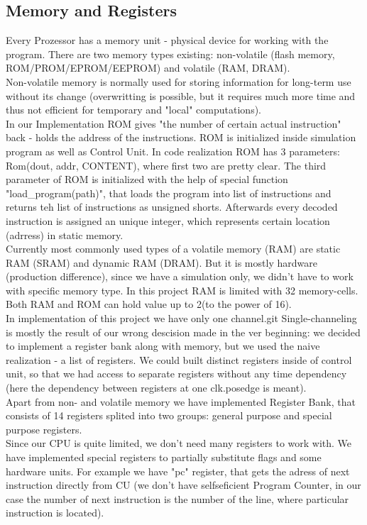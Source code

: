 \documentclass[11pt,a4paper]{article}
\begin{document}
\subsection{Memory and Registers}
Every Prozessor has a memory unit - physical device for working with the program. There are two memory types existing: non-volatile (flash memory,  ROM/PROM/EPROM/EEPROM) and volatile (RAM, DRAM).\\
Non-volatile memory is normally used for storing information for long-term use without its change (overwritting is possible, but it requires much more time and thus not efficient for temporary and "local" computations).\\
In our Implementation ROM gives "the number of certain actual instruction" back - holds the address of the instructions. ROM is initialized inside simulation program as well as Control Unit. In code realization ROM has 3 parameters: Rom(dout, addr, CONTENT), where first two are pretty clear. The third parameter of ROM is initialized with the help of special function "load\_program(path)", that loads the program into list of instructions and returns teh list of instructions as unsigned shorts. Afterwards every decoded instruction is assigned an  unique integer, which represents certain location (adrress) in static memory.\\
Currently most commonly used types of a volatile memory (RAM) are static RAM (SRAM) and dynamic RAM (DRAM). But it is mostly hardware (production difference), since we have a simulation only, we didn't have to work with specific memory type. In this project RAM is limited with 32 memory-cells. Both RAM and ROM can hold value up to 2(to the power of 16). \\
In implementation of this project we have only one channel.git Single-channeling is mostly the result of our wrong descision made in the ver beginning: we decided to implement a register bank along with memory, but we used the naive realization - a list of registers. We could built distinct registers inside of control unit, so that we had access to separate registers without any time dependency (here the dependency between registers at one clk.posedge is meant).\\
Apart from non- and volatile memory we have implemented Register Bank, that consists of 14 registers splited into two groups: general purpose and special purpose registers.\\
Since our CPU is quite limited, we don't need many registers to work with. We have implemented special registers to partially substitute flags and some hardware units. For example we have "pc" register, that gets the adress of next instruction directly from CU (we don't have selfseficient Program Counter, in our case the number of next instruction is the number of the line, where particular instruction is located).\\
\end{document}
